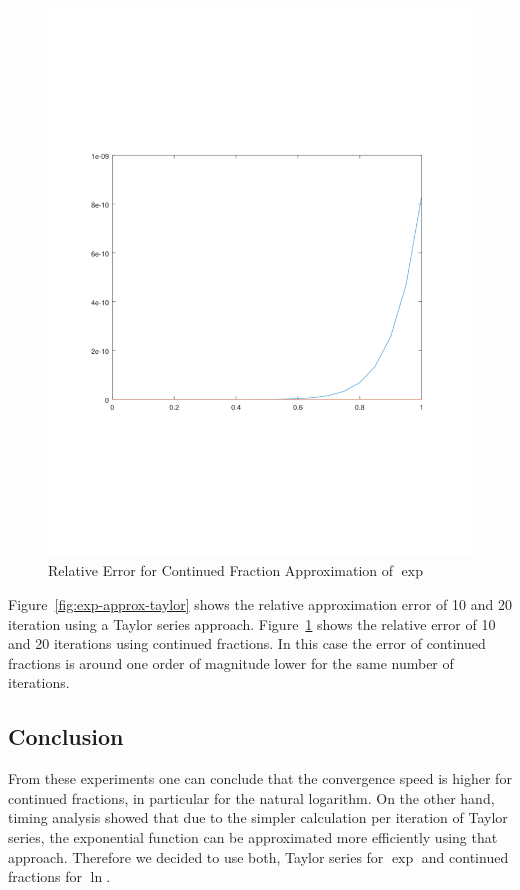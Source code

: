 \documentclass[11pt,a4paper,dvipsnames]{article}
\theoremstyle{definition}
\theoremstyle{definition}
\begin{document}
\begin{figure}[ht]
  \centering
    \includegraphics[width=\textwidth]{cf_exp}
  \caption{Relative Error for Continued Fraction Approximation of  $\exp$}
  \label{fig:exp-approx-cf}
\end{figure}

Figure~\ref{fig:exp-approx-taylor} shows the relative approximation error of 10
and 20 iteration using a Taylor series approach. Figure~\ref{fig:exp-approx-cf}
shows the relative error of 10 and 20 iterations using continued fractions. In
this case the error of continued fractions is around one order of magnitude
lower for the same number of iterations.

\subsection{Conclusion}
\label{sec:conclusion}

From these experiments one can conclude that the convergence speed is higher for
continued fractions, in particular for the natural logarithm. On the other hand,
timing analysis showed that due to the simpler calculation per iteration of
Taylor series, the exponential function can be approximated more efficiently
using that approach. Therefore we decided to use both, Taylor series for $\exp$
and continued fractions for $\ln$.
\end{document}
